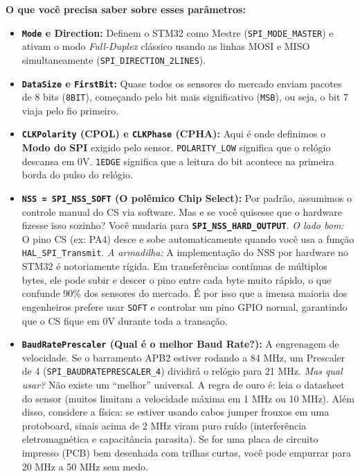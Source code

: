 \documentclass[12pt,a4paper]{article}
\begin{document}
\textbf{O que você precisa saber sobre esses parâmetros:}
\begin{itemize}
    \item \textbf{\texttt{Mode} e \textbf{Direction}:} Definem o STM32 como Mestre (\texttt{SPI\_MODE\_MASTER}) e ativam o modo \textit{Full-Duplex} clássico usando as linhas MOSI e MISO simultaneamente (\texttt{SPI\_DIRECTION\_2LINES}).
    
    \item \textbf{\texttt{DataSize} e \texttt{FirstBit}:} Quase todos os sensores do mercado enviam pacotes de 8 bits (\texttt{8BIT}), começando pelo bit mais significativo (\texttt{MSB}), ou seja, o bit 7 viaja pelo fio primeiro.
    
    \item \textbf{\texttt{CLKPolarity} (CPOL) e \texttt{CLKPhase} (CPHA):} Aqui é onde definimos o \textbf{Modo do SPI} exigido pelo sensor. \texttt{POLARITY\_LOW} significa que o relógio descansa em 0V. \texttt{1EDGE} significa que a leitura do bit acontece na primeira borda do pulso do relógio. 
    
    
    \item \textbf{\texttt{NSS = SPI\_NSS\_SOFT} (O polêmico Chip Select):} 
    Por padrão, assumimos o controle manual do CS via software. Mas e se você quisesse que o hardware fizesse isso sozinho? Você mudaria para \textbf{\texttt{SPI\_NSS\_HARD\_OUTPUT}}. 
    \textit{O lado bom:} O pino CS (ex: PA4) desce e sobe automaticamente quando você usa a função \texttt{HAL\_SPI\_Transmit}.
    \textit{A armadilha:} A implementação do NSS por hardware no STM32 é notoriamente rígida. Em transferências contínuas de múltiplos bytes, ele pode subir e descer o pino entre cada byte muito rápido, o que confunde 90\% dos sensores do mercado. É por isso que a imensa maioria dos engenheiros prefere usar \texttt{SOFT} e controlar um pino GPIO normal, garantindo que o CS fique em 0V durante toda a transação.
    
    \item \textbf{\texttt{BaudRatePrescaler} (Qual é o melhor Baud Rate?):} 
    A engrenagem de velocidade. Se o barramento APB2 estiver rodando a 84 MHz, um Prescaler de 4 (\texttt{SPI\_BAUDRATEPRESCALER\_4}) dividirá o relógio para 21 MHz. 
    \textit{Mas qual usar?} Não existe um ``melhor'' universal. A regra de ouro é: leia o datasheet do sensor (muitos limitam a velocidade máxima em 1 MHz ou 10 MHz). Além disso, considere a física: se estiver usando cabos jumper frouxos em uma protoboard, sinais acima de 2 MHz viram puro ruído (interferência eletromagnética e capacitância parasita). Se for uma placa de circuito impresso (PCB) bem desenhada com trilhas curtas, você pode empurrar para 20 MHz a 50 MHz sem medo.
    

\end{itemize}
\end{document}
